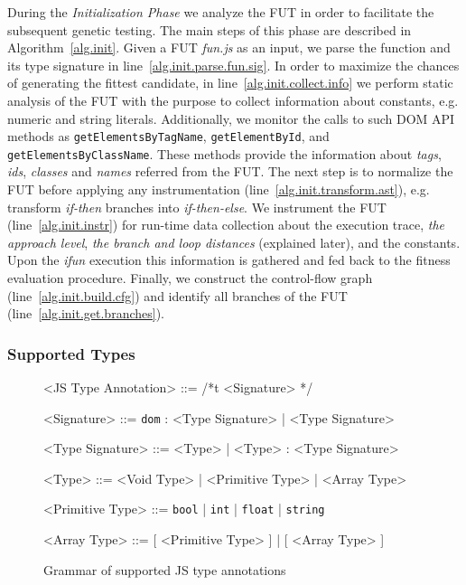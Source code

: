 \documentclass[sigconf,review]{acmart}
\begin{document}
During the \emph{Initialization Phase} we analyze the FUT in order to facilitate the subsequent genetic testing. The main steps of this phase are described in Algorithm~\ref{alg.init}. Given a FUT \emph{fun.js} as an input, we parse the function and its type signature in line~\ref{alg.init.parse.fun.sig}. In order to maximize the chances of generating the fittest candidate, in line~\ref{alg.init.collect.info} we perform static analysis of the FUT with the purpose to collect information about constants, e.g. numeric and string literals. Additionally, we monitor the calls to such DOM API methods as \texttt{getElementsByTagName}, \texttt{getElementById}, and \texttt{getElementsByClassName}. These methods provide the information about \emph{tags}, \emph{ids}, \emph{classes} and \emph{names} referred from the FUT. The next step is to normalize the FUT before applying any instrumentation (line~\ref{alg.init.transform.ast}), e.g. transform \emph{if-then} branches into \emph{if-then-else}. We instrument the FUT (line~\ref{alg.init.instr}) for run-time data collection about the execution trace, \emph{the approach level}, \emph{the branch and loop distances} (explained later), and the constants. Upon the \emph{ifun} execution this information is gathered and fed back to the fitness evaluation procedure. Finally, we construct the control-flow graph (line~\ref{alg.init.build.cfg}) and identify all branches of the FUT (line~\ref{alg.init.get.branches}).

\subsubsection{Supported Types}
\label{sub.sec.sup.types}

\begin{figure}[t!]
\setlength{\grammarparsep}{3pt}
\footnotesize
\begin{grammar}
<JS Type Annotation> ::= /*t <Signature> */ 

<Signature> ::= \texttt{dom} : <Type Signature> | <Type Signature>

<Type Signature> ::= <Type> | <Type> : <Type Signature>

<Type> ::= <Void Type> | <Primitive Type> | <Array Type>

<Primitive Type> ::= \texttt{bool} | \texttt{int} | \texttt{float} | \texttt{string}

<Array Type> ::= [ <Primitive Type> ] | [ <Array Type> ]
\end{grammar}
\caption{Grammar of supported JS type annotations}
\label{fig.js.type.annot}
\end{figure}
\end{document}
